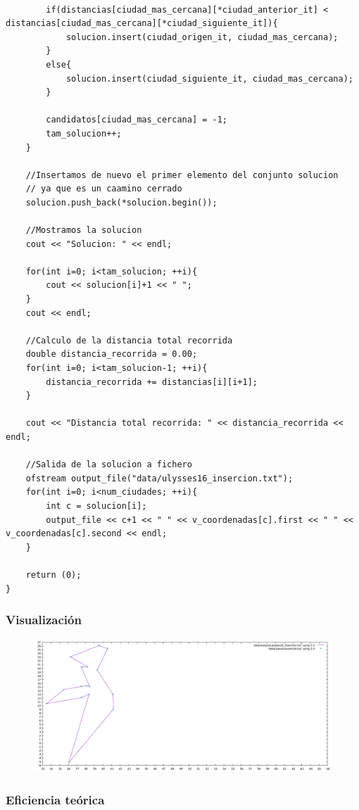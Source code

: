 \documentclass[11pt,a4paper]{article} %
\begin{document}
\begin{lstlisting}[style=C++]
		
		if(distancias[ciudad_mas_cercana][*ciudad_anterior_it] < distancias[ciudad_mas_cercana][*ciudad_siguiente_it]){
			solucion.insert(ciudad_origen_it, ciudad_mas_cercana);
		}
		else{
			solucion.insert(ciudad_siguiente_it, ciudad_mas_cercana);
		}
		
		candidatos[ciudad_mas_cercana] = -1;
		tam_solucion++;
	}
	
	//Insertamos de nuevo el primer elemento del conjunto solucion
	// ya que es un caamino cerrado
	solucion.push_back(*solucion.begin());
	
	//Mostramos la solucion
	cout << "Solucion: " << endl;
	
	for(int i=0; i<tam_solucion; ++i){
		cout << solucion[i]+1 << " ";
	}
	cout << endl;
	
	//Calculo de la distancia total recorrida
	double distancia_recorrida = 0.00;
	for(int i=0; i<tam_solucion-1; ++i){
		distancia_recorrida += distancias[i][i+1];
	}
	
	cout << "Distancia total recorrida: " << distancia_recorrida << endl;
	
	//Salida de la solucion a fichero
	ofstream output_file("data/ulysses16_insercion.txt");
	for(int i=0; i<num_ciudades; ++i){
		int c = solucion[i];
		output_file << c+1 << " " << v_coordenadas[c].first << " " << v_coordenadas[c].second << endl;
	}
	
	return (0);
}
\end{lstlisting}

\subsubsection{Visualización}
\begin{figure}[H]
	\centering
	\includegraphics[width=13cm]{data/graphics/insercion/insercion_final.pdf}
\end{figure}

\subsubsection{Eficiencia teórica}
\end{document}
